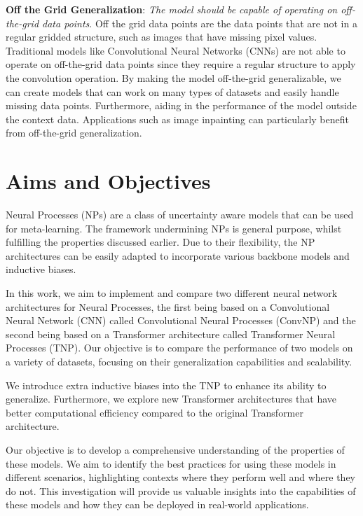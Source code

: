 \documentclass[../../main.tex]{subfiles}
\begin{document}
\textbf{Off the Grid Generalization}: \emph{The model should be capable of operating on off-the-grid data points}. Off the grid data points are the data points that are not in a regular gridded structure, such as images that have missing pixel values. Traditional models like Convolutional Neural Networks (CNNs) are not able to operate on off-the-grid data points since they require a regular structure to apply the convolution operation. By making the model off-the-grid generalizable, we can create models that can work on many types of datasets and easily handle missing data points. Furthermore, aiding in the performance of the model outside the context data. Applications such as image inpainting can particularly benefit from off-the-grid generalization.


\section{Aims and Objectives}

Neural Processes (NPs) \parencite{garnelo2018neural} are a class of uncertainty aware models that can be used for meta-learning. The framework undermining NPs is general purpose, whilst fulfilling the properties discussed earlier. Due to their flexibility, the NP architectures can be easily adapted to incorporate various backbone models and inductive biases. 

In this work, we aim to implement and compare two different neural network architectures for Neural Processes, the first being based on a Convolutional Neural Network (CNN) called Convolutional Neural Processes (ConvNP) and the second being based on a Transformer architecture called Transformer Neural Processes (TNP). Our objective is to compare the performance of two models on a variety of datasets, focusing on their generalization capabilities and scalability.

We introduce extra inductive biases into the TNP to enhance its ability to generalize. Furthermore, we explore new Transformer architectures that have better computational efficiency compared to the original Transformer architecture.

Our objective is to develop a comprehensive understanding of the properties of these models. We aim to identify  the best practices for using these models in different scenarios, highlighting contexts where they perform well and where they do not. This investigation will provide us valuable insights into the capabilities of these models and how they can be deployed in real-world applications.





\ifSubfilesClassLoaded{%
    \printbibliography{}
}{} 
\end{document}
